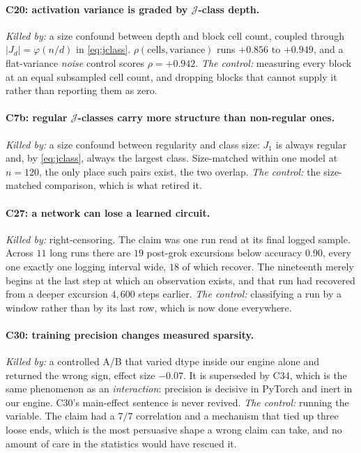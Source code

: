 \paragraph{C20: activation variance is graded by $\mathcal{J}$-class depth.} \emph{Killed
by:} a size confound between depth and block cell count, coupled through
$|J_{d}| = \varphi(n/d)$ in \eqref{eq:jclass}. $\rho(\text{cells},
\text{variance})$ runs $+0.856$ to $+0.949$, and a flat-variance \emph{noise} control scores
$\rho = +0.942$. \emph{The control:} measuring every block at an equal subsampled cell count,
and dropping blocks that cannot supply it rather than reporting them as zero.

\paragraph{C7b: regular $\mathcal{J}$-classes carry more structure than non-regular ones.}
\emph{Killed by:} a size confound between regularity and class size: $J_{1}$ is always
regular and, by \eqref{eq:jclass}, always the largest class. Size-matched within one model at $n = 120$, the only place such
pairs exist, the two overlap. \emph{The control:} the size-matched comparison, which is what
retired it.

\paragraph{C27: a network can lose a learned circuit.} \emph{Killed by:} right-censoring. The
claim was one run read at its final logged sample. Across $11$ long runs there are $19$
post-grok excursions below accuracy $0.90$, every one exactly one logging interval wide, $18$
of which recover. The nineteenth merely begins at the last step at which an observation
exists, and that run had recovered from a deeper excursion $4{,}600$ steps earlier. \emph{The control:}
classifying a run by a window rather than by its last row, which is now done everywhere.

\paragraph{C30: training precision changes measured sparsity.} \emph{Killed by:} a controlled
A/B that varied dtype inside our engine alone and returned the wrong sign, effect size
$-0.07$. It is superseded by C34, which is the same phenomenon as an \emph{interaction}:
precision is decisive in PyTorch and inert in our engine. C30's main-effect sentence is never
revived. \emph{The control:} running the variable. The claim had a $7/7$ correlation and a
mechanism that tied up three loose ends, which is the most persuasive shape a wrong claim can
take, and no amount of care in the statistics would have rescued it.

